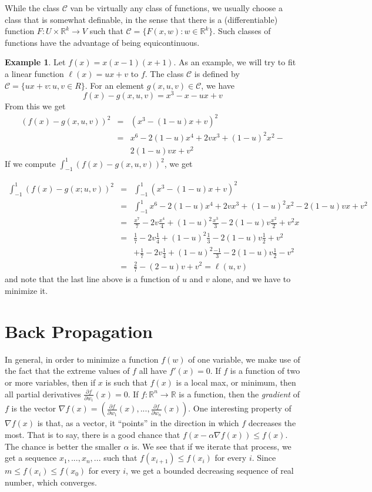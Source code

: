 \documentclass[10pt]{amsart}
\newcommand{\R}{\mathbb{R}}
\newcommand{\C}{\mathcal{C}}
\theoremstyle{definition}
\newtheorem{example}[theorem]{Example}
\begin{document}
 While the class $\C$ van be virtually any class of functions, we usually choose a class
 that is somewhat definable, in the sense that there is a (differentiable) function $F:U\times\R^k\to V$
 such that $\C=\{F(x, w): w\in \R^k\}$.  Such classes of functions have the advantage of
 being equicontinuous.


 \begin{example}
 Let $f(x)=x(x-1)(x+1)$.  As an example, we will try to fit a linear function
 $\ell(x)=ux+v$ to $f$.  The class $\C$ is defined by $\C=\{ux+v:u,v\in R\}$.
 For an element $g(x, u, v)\in\C$, we have $$f(x)-g(x,u,v) = x^3-x - ux+v$$
 From this we get
 \begin{eqnarray*}
   (f(x)-g(x,u,v))^2 &=& (x^3 - (1-u)x + v)^2 \\
   {} &=& x^6 - 2(1-u)x^4 + 2vx^3 + (1-u)^2x^2 - \\
   {} & & 2(1-u)vx + v^2
 \end{eqnarray*}
 If we compute $\int_{-1}^1 (f(x)-g(x,u,v))^2$, we get

 \begin{eqnarray*}
   \int_{-1}^1(f(x)-g(x; u,v))^2 &=& \int_{-1}^1(x^3 - (1-u)x + v)^2 \\
   {} &=& \int_{-1}^1x^6 - 2(1-u)x^4 + 2vx^3 + (1-u)^2x^2 - 2(1-u)vx + v^2\\
   {} &=& \frac{x^7}{7}-2v\frac{x^4}{4} + (1-u)^2\frac{x^3}{3} - 2(1-u)v\frac{x^2}{2}+v^2x\\
   {} &=& \frac{1}{7}-2v\frac{1}{4} + (1-u)^2\frac{1}{3} - 2(1-u)v\frac{1}{2}+v^2\\
   {} & & +\frac{1}{7}-2v\frac{1}{4} + (1-u)^2\frac{-1}{3} - 2(1-u)v\frac{1}{2}-v^2\\
   {} &=& \frac{2}{7} - (2-u)v+v^2 = \ell(u,v)
 \end{eqnarray*}
 and note that the last line above is a function of $u$ and $v$ alone, and we have to minimize it.
 \end{example}




\section{Back Propagation}

In general, in order to minimize a function $f(w)$ of one variable, we make use of the fact that
the extreme values of $f$ all have $f'(x)=0$.  If $f$ is a function of two or more variables, then
if $x$ is such that $f(x)$ is a local max, or minimum, then all partial derivatives
$\frac{\partial f}{\partial w_i}(x)=0$.  If $f:\R^n\to\R$ is a function, then the
{\em gradient} of $f$ is the vector
$\nabla f(x) = \left(\frac{\partial f}{\partial w_1}(x),...,\frac{\partial f}{\partial w_n}(x)\right)$.
One interesting property of $\nabla f(x)$ is that, as a vector, it ``points'' in the direction in which
$f$ decreases the most.  That is to say, there is a good chance that $f(x-\alpha\nabla f(x))\leq f(x)$.
The chance is better the smaller $\alpha$ is.  We see that if we iterate that process, we get a
sequence $x_1,...,x_n,...$ such that $f(x_{i+1})\leq f(x_i)$ for every $i$.  Since $m\leq f(x_i)\leq f(x_0)$
for every $i$, we get a bounded decreasing sequence of real number, which converges.
\end{document}
